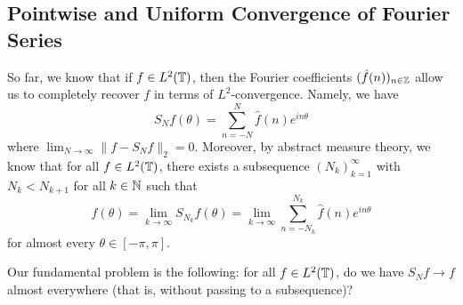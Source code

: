 \subsection{Pointwise and Uniform Convergence of Fourier Series} \label{subsec:4.3}
So far, we know that if $f \in L^2(\mathbb{T})$, then the Fourier coefficients 
$(\hat f(n))_{n\in\mathbb{Z}}$ allow us to completely recover $f$ in terms of 
$L^2$-convergence. Namely, we have 
\[ S_Nf(\theta) = \sum_{n=-N}^N \hat f(n) e^{in\theta} \] 
where $\lim_{N\to\infty} \|f - S_Nf\|_2 = 0$. Moreover, by abstract 
measure theory, we know that for all $f \in L^2(\mathbb{T})$, there exists a subsequence 
$(N_k)_{k=1}^\infty$ with $N_k < N_{k+1}$ for all $k \in \mathbb{N}$ such that 
\[ f(\theta) = \lim_{k\to\infty} S_{N_k}f(\theta) = \lim_{k\to\infty} 
\sum_{n=-N_k}^{N_k} \hat f(n) e^{in\theta} \] 
for almost every $\theta \in [-\pi, \pi]$. 

Our fundamental problem is the following: for all $f \in L^2(\mathbb{T})$, do we have 
$S_Nf \to f$ almost everywhere (that is, without passing to a subsequence)? 